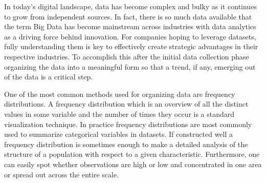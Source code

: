 In today's digital landscape, data has become complex and bulky as it continues to 
grow from independent sources. In fact, there is so much data available that the 
term Big Data has become mainstream across industries with data analytics as a 
driving force behind innovation. For companies hoping to leverage datasets, fully
understanding them is key to effectively create strategic advantages in their respective 
industries. To accomplish this after the initial data collection phase organizing 
the data into a meaningful form so that a trend, if any, emerging out of the data 
is a critical step. 

One of the most common methods used for organizing data are frequency distributions.
A frequency distribution which is an overview of all the distinct values in some 
variable and the number of times they occur is a standard visualization technique. 
In practice frequency distributions are most commonly used to summarize categorical 
variables in datasets. If constructed well a frequency distribution is sometimes 
enough to make a detailed analysis of the structure of a population with respect 
to a given characteristic. Furthermore, one can easily spot whether observations 
are high or low and concentrated in one area or spread out across the entire scale. 

